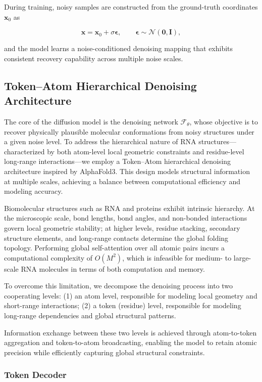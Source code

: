 During training, noisy samples are constructed from the ground-truth coordinates $\mathbf{x}_0$ as

$$  
\mathbf{x} = \mathbf{x}_0 + \sigma \boldsymbol{\epsilon}, \qquad \boldsymbol{\epsilon} \sim \mathcal{N}(\mathbf{0}, \mathbf{I}),  
$$

and the model learns a noise-conditioned denoising mapping that exhibits consistent recovery capability across multiple noise scales.

\subsection{Token–Atom Hierarchical Denoising Architecture}

The core of the diffusion model is the denoising network $\mathcal{F}_\theta$, whose objective is to recover physically plausible molecular conformations from noisy structures under a given noise level. To address the hierarchical nature of RNA structures—characterized by both atom-level local geometric constraints and residue-level long-range interactions—we employ a Token–Atom hierarchical denoising architecture inspired by AlphaFold3. This design models structural information at multiple scales, achieving a balance between computational efficiency and modeling accuracy.

Biomolecular structures such as RNA and proteins exhibit intrinsic hierarchy. At the microscopic scale, bond lengths, bond angles, and non-bonded interactions govern local geometric stability; at higher levels, residue stacking, secondary structure elements, and long-range contacts determine the global folding topology. Performing global self-attention over all atomic pairs incurs a computational complexity of $O(M^2)$, which is infeasible for medium- to large-scale RNA molecules in terms of both computation and memory.

To overcome this limitation, we decompose the denoising process into two cooperating levels:  
(1) an atom level, responsible for modeling local geometry and short-range interactions;  
(2) a token (residue) level, responsible for modeling long-range dependencies and global structural patterns.

Information exchange between these two levels is achieved through atom-to-token aggregation and token-to-atom broadcasting, enabling the model to retain atomic precision while efficiently capturing global structural constraints.

\subsubsection{Token Decoder}

